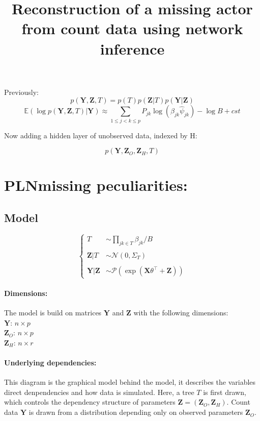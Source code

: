 \documentclass[11pt,a4paper]{article}
\title{Reconstruction of a missing actor from count data using network inference}
\newcommand{\Xbf}{\boldsymbol{X}}
\newcommand{\Ybf}{\boldsymbol{Y}}
\newcommand{\Zbf}{\boldsymbol{Z}}
\newcommand{\Esp}{\mathds{E}}
\newcommand{\edgeunit}{1.5}
\begin{document}
\maketitle
\vspace{3cm}
\tableofcontents
\newpage
Previously:
$$ p(\Ybf,\Zbf,T) = p(T)p(\Zbf|T)p(\Ybf|\Zbf)$$
$$ \Esp(\log p(\Ybf,\Zbf,T)|\Ybf) \approx \sum_{1 \leq j < k \leq p} P_{jk} \log\left(\beta_{jk} \hat{\psi}_{jk}\right) - \log B + cst$$

Now adding a hidden layer of unobserved data, indexed by H:

$$ p(\Ybf,\Zbf_O,\Zbf_H,T)$$
\section{PLNmissing peculiarities:}

\subsection{Model}

$$\left\{\begin{array}{rl}
T & \sim\prod_{jk \in T} \beta_{jk}/B \\\\
\Zbf|T& \sim\mathcal{N}(0,\Sigma_T)\\\\
\Ybf|\Zbf&\sim\mathcal{P}( \exp( \Xbf\theta^\intercal + \Zbf) )
\end{array} \right.$$

\paragraph{Dimensions:}
The model is build on matrices $\Ybf$ and $\Zbf$ with the following dimensions:\\
$\Ybf$: $n\times p$\\
$\Zbf_O$: $n\times p$\\
$\Zbf_H$: $n\times r$


\paragraph{Underlying dependencies:} This diagram is the graphical model behind the model, it describes the variables direct denpendencies and how data is simulated. Here, a tree $T$ is first drawn, which controls the dependency structure of parameters $\Zbf = (\Zbf_O,\Zbf_H)$. Count data $\Ybf$ is drawn from a distribution depending only on observed parameters $\Zbf_O$.
\begin{center}
\end{center}
\end{document}
